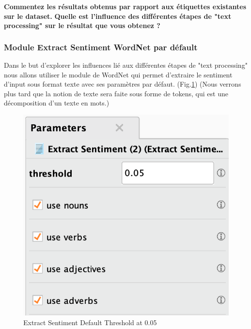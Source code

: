 \documentclass[a4paper]{article}
\begin{document}
\textbf{Commentez les résultats obtenus par rapport aux étiquettes existantes sur le dataset.}
\textbf{Quelle est l'influence des différentes étapes de "text processing" sur le résultat que vous obtenez ?}

\subsubsection{Module Extract Sentiment WordNet par défault}
Dans le but d'explorer les influences lié aux différentes étapes de "text processing" nous allons utiliser le module de WordNet qui permet d'extraire le sentiment d'input sous format texte avec ses paramètres par défaut. (Fig.\ref{fig:3_processing_documents_full_0_05}) (Nous verrons plus tard que la notion de texte sera faite sous forme de tokens, qui est une décomposition d'un texte en mots.)
\begin{figure}[H]
\centering
	\includegraphics[width=\linewidth/3]{imgs/part_3/3_processing_documents_full_0_05}
	\caption{Extract Sentiment Default Threshold at 0.05}
	\label{fig:3_processing_documents_full_0_05}
\end{figure}


\vspace{6pt}
\end{document}
